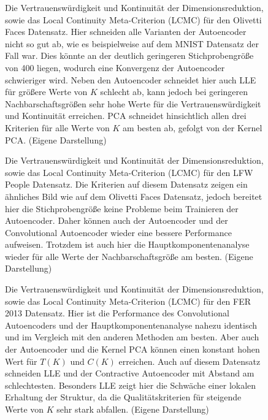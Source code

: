\begin{figure}[ht]
	\begin{center}
		
	\end{center}
	\caption[Qualitätskriterien für den Olivetti Faces Datensatz]{Die Vertrauenswürdigkeit und Kontinuität der Dimensionsreduktion, sowie das Local Continuity Meta-Criterion (LCMC) für den Olivetti Faces Datensatz. Hier schneiden alle Varianten der Autoencoder nicht so gut ab, wie es beispielweise auf dem MNIST Datensatz der Fall war. Dies könnte an der deutlich geringeren Stichprobengröße von 400 liegen, wodurch eine Konvergenz der Autoencoder schwieriger wird. Neben den Autoencoder schneidet hier auch LLE für größere Werte von $K$ schlecht ab, kann jedoch bei geringeren Nachbarschaftsgrößen sehr hohe Werte für die Vertrauenswürdigkeit und Kontinuität erreichen. PCA schneidet hinsichtlich allen drei Kriterien für alle Werte von $K$ am besten ab, gefolgt von der Kernel PCA. (Eigene Darstellung)}
	\label{fig:OlivettiFacesMetrics}
\end{figure}

\begin{figure}[ht]
	\begin{center}
		
	\end{center}
	\caption[Qualitätskriterien für den LFW-Datensatz]{Die Vertrauenswürdigkeit und Kontinuität der Dimensionsreduktion, sowie das Local Continuity Meta-Criterion (LCMC) für den LFW People Datensatz. Die Kriterien auf diesem Datensatz zeigen ein ähnliches Bild wie auf dem Olivetti Faces Datensatz, jedoch bereitet hier die Stichprobengröße keine Probleme beim Trainieren der Autoencoder. Daher können auch der Autoencoder und der Convolutional Autoencoder wieder eine bessere Performance aufweisen. Trotzdem ist auch hier die Hauptkomponentenanalyse wieder für alle Werte der Nachbarschaftsgröße am besten. (Eigene Darstellung)}
	\label{fig:LfwPeopleMetrics}
\end{figure}

\begin{figure}[ht]
	\begin{center}
		
	\end{center}
	\caption[Qualitätskriterien für den FER-Datensatz]{Die Vertrauenswürdigkeit und Kontinuität der Dimensionsreduktion, sowie das Local Continuity Meta-Criterion (LCMC) für den FER 2013 Datensatz. Hier ist die Performance des Convolutional Autoencoders und der Hauptkomponentenanalyse nahezu identisch und im Vergleich mit den anderen Methoden am besten. Aber auch der Autoencoder und die Kernel PCA können einen konstant hohen Wert für $T(K)$ und $C(K)$ erreichen. Auch auf diesem Datensatz schneiden LLE und der Contractive Autoencoder mit Abstand am schlechtesten. Besonders LLE zeigt hier die Schwäche einer lokalen Erhaltung der Struktur, da die Qualitätskriterien für steigende Werte von $K$ sehr stark abfallen. (Eigene Darstellung)}
	\label{fig:FER2013Metrics}
\end{figure}